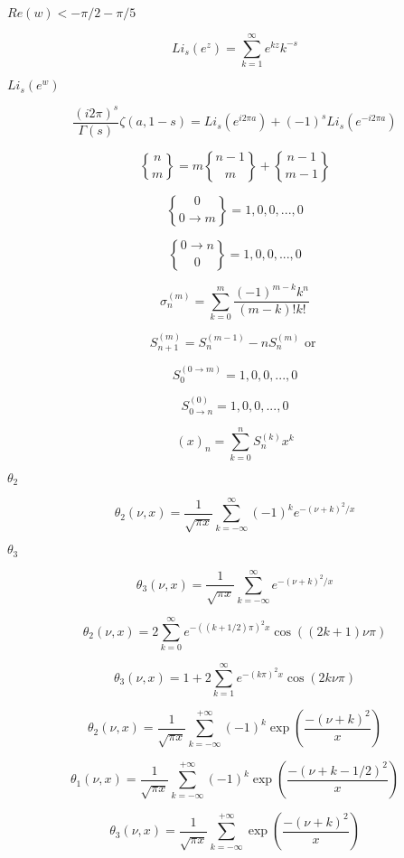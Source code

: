 \documentclass{article}
\begin{document}
$ Re(w) < -\pi/2 - \pi/5 $
\pagebreak

\[ Li_s(e^z) = \sum_{k=1}^{\infty} e^{kz} k^{-s} \]
\pagebreak

$ Li_s(e^w) $
\pagebreak

\[ \frac{(i2\pi)^s}{\Gamma(s)}\zeta(a,1-s) = Li_s(e^{i2\pi a}) + (-1)^s Li_s(e^{-i2\pi a}) \]
\pagebreak

\[ \newcommand{\stirling}[2]{\genfrac{\{}{\}}{0pt}{0}{#1}{#2}} \stirling{n}{m} = m \stirling{n-1}{m} + \stirling{n-1}{m-1} \]
\pagebreak

\[ \newcommand{\stirling}[2]{\genfrac{\{}{\}}{0pt}{0}{#1}{#2}} \stirling{0}{0\rightarrow m} = {1, 0, 0, ..., 0} \]
\pagebreak

\[ \newcommand{\stirling}[2]{\genfrac{\{}{\}}{0pt}{0}{#1}{#2}} \stirling{0\rightarrow n}{0} = {1, 0, 0, ..., 0} \]
\pagebreak

\[ \sigma_n^{(m)} = \sum_{k=0}^{m}\frac{(-1)^{m-k}k^n}{(m-k)!k!} \]
\pagebreak

\[ S_{n+1}^{(m)} = S_n^{(m-1)} - n S_n^{(m)} \mbox{ or } \]
\pagebreak

\[ S_0^{(0\rightarrow m)} = {1, 0, 0, ..., 0} \]
\pagebreak

\[ S_{0\rightarrow n}^{(0)} = {1, 0, 0, ..., 0} \]
\pagebreak

\[ (x)_n = \sum_{k=0}^{n} S_n^{(k)} x^k \]
\pagebreak

$ \theta_2 $
\pagebreak

\[ \theta_2(\nu, x) = \frac{1}{\sqrt{\pi x}} \sum_{k=-\infty}^{\infty}(-1)^k e^{-(\nu+k)^2/x} \]
\pagebreak

$ \theta_3 $
\pagebreak

\[ \theta_3(\nu, x) = \frac{1}{\sqrt{\pi x}} \sum_{k=-\infty}^{\infty} e^{-(\nu+k)^2/x} \]
\pagebreak

\[ \theta_2(\nu, x) = 2\sum_{k=0}^{\infty} e^{-((k+1/2)\pi)^2 x} \cos((2k+1)\nu\pi) \]
\pagebreak

\[ \theta_3(\nu, x) = 1 + 2\sum_{k=1}^{\infty} e^{-(k\pi)^2 x} \cos(2k\nu\pi) \]
\pagebreak

\[ \theta_2(\nu,x) = \frac{1}{\sqrt{\pi x}} \sum_{k=-\infty}^{+\infty} (-1)^k \exp\left( \frac{-(\nu + k)^2}{x} \right) \]
\pagebreak

\[ \theta_1(\nu,x) = \frac{1}{\sqrt{\pi x}} \sum_{k=-\infty}^{+\infty} (-1)^k \exp\left( \frac{-(\nu + k - 1/2)^2}{x} \right) \]
\pagebreak

\[ \theta_3(\nu,x) = \frac{1}{\sqrt{\pi x}} \sum_{k=-\infty}^{+\infty} \exp\left( \frac{-(\nu+k)^2}{x} \right) \]
\pagebreak
\end{document}

